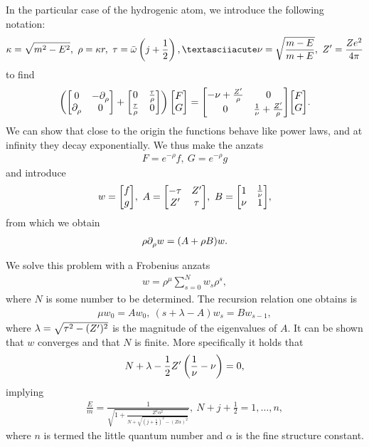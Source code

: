 In the particular case of the hydrogenic atom, we introduce the following notation:
\begin{align*}
	\kappa = \sqrt{m^{2} - E^{2}},\ \rho = \kappa r,\ \tau = \bar{\omega}\left(j + \frac{1}{2}\right),´ \nu = \sqrt{\frac{m - E}{m + E}},\ Z\p = \frac{Ze^{2}}{4\pi}
\end{align*}
to find
\begin{align*}
	\left(\mqty[
		0              & -\del{}{\rho}{} \\
		\del{}{\rho}{} & 0
	] + \mqty[
		0                                                   & \frac{\tau}{\rho} \\
		\frac{\tau}{\rho} & 0
	]\right)\mqty[
		F \\
		G
	] = \mqty[
		-\nu + \frac{Z\p}{\rho} & 0 \\
		0                       & \frac{1}{\nu} + \frac{Z\p}{\rho}
	]\mqty[
		F \\
		G
	].
\end{align*}
We can show that close to the origin the functions behave like power laws, and at infinity they decay exponentially. We thus make the anzats
\begin{align*}
	F = e^{-\rho}f,\ G = e^{-\rho}g
\end{align*}
and introduce
\begin{align*}
	w = \mqty[
		f \\
		g
	],\ A = \mqty[
		-\tau & Z\p \\
		Z\p & \tau
	],\ B = \mqty[
		1   & \frac{1}{\nu} \\
		\nu & 1
	],
\end{align*}
from which we obtain
\begin{align*}
	\rho\partial^{}_{\rho}{w} = (A + \rho B)w.
\end{align*}

We solve this problem with a Frobenius anzats
\begin{align*}
	w = \rho^{\mu}\sum\limits_{s = 0}^{N}w_{s}\rho^{s},
\end{align*}
where $N$ is some number to be determined. The recursion relation one obtains is
\begin{align*}
	\mu w_{0} = Aw_{0},\ (s + \lambda - A)w_{s} = Bw_{s - 1},
\end{align*}
where $\lambda = \sqrt{\tau^{2} - (Z^{\prime})^{2}}$ is the magnitude of the eigenvalues of $A$. It can be shown that $w$ converges and that $N$ is finite. More specifically it holds that
\begin{align*}
	N + \lambda - \frac{1}{2}Z^{\prime}\left(\frac{1}{\nu} - \nu\right) = 0,
\end{align*}
implying
\begin{align*}
	\frac{E}{m} = \frac{1}{\sqrt{1 + \frac{Z^{2}\alpha^{2}}{N + \sqrt{\left(j + \frac{1}{2}\right)^{2} - (Z\alpha)^{2}}}}},\ N + j + \frac{1}{2} = 1, \dots, n,
\end{align*}
where $n$ is termed the little quantum number and $\alpha$ is the fine structure constant.

